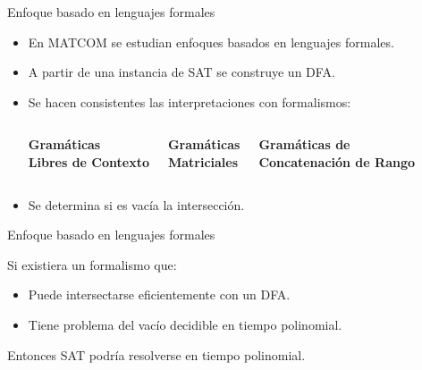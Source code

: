 \documentclass{beamer}
\begin{document}
\begin{frame}{Enfoque basado en lenguajes formales}
    \begin{itemize}
        \item En MATCOM se estudian enfoques basados en lenguajes formales.

              \pause

        \item A partir de una instancia de SAT se construye un DFA.

              \pause

        \item Se hacen consistentes las interpretaciones con formalismos:
              \vspace{0.8cm}

              \begin{columns}[c]
                  \centering
                  \textbf{Gramáticas}\\
                  \textbf{Libres de Contexto}

                  \centering
                  \textbf{Gramáticas}\\
                  \textbf{Matriciales}

                  \centering
                  \textbf{Gramáticas de}\\
                  \textbf{Concatenación de Rango}
              \end{columns}

        \item Se determina si es vacía la intersección.
    \end{itemize}
\end{frame}

\begin{frame}{Enfoque basado en lenguajes formales}

    Si existiera un formalismo que:

    \pause

    \begin{itemize}
        \item Puede intersectarse eficientemente con un DFA.

              \pause

        \item Tiene problema del vacío decidible en tiempo polinomial.
    \end{itemize}

    \vspace{0.8cm}

    \pause

    \begin{center}
        \Large
        Entonces SAT podría resolverse en tiempo polinomial.
    \end{center}

\end{frame}
\end{document}
